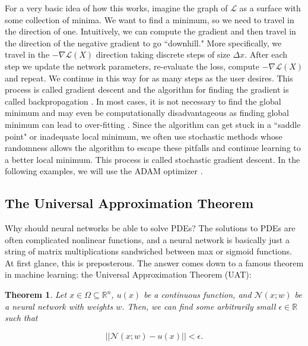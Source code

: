 \documentclass{CUP-JNL-DTM}%
\newtheorem{theorem}{Theorem}[section]
\theoremstyle{definition}
\numberwithin{equation}{section}
\newcommand{\loss}{\mathcal{L}}
\newcommand{\net}{\mathcal{N}}
\begin{document}
For a very basic idea of how this works, imagine the graph of $\loss$ as a surface with some collection of minima. We want to find a minimum, so we need to travel in the direction of one. Intuitively, we can compute the gradient and then travel in the direction of the negative gradient to go ``downhill." More specifically, we travel in the $-\nabla \loss(X)$ direction taking discrete steps of size $\Delta x$. After each step we update the network parameters, re-evaluate the loss, compute $-\nabla \loss(X)$ and repeat. We continue in this way for as many steps as the user desires. This process is called gradient descent and the algorithm for finding the gradient is called backpropagation \cite{chauvinBackpropagationTheoryArchitectures1995}. In most cases, it is not necessary to find the global minimum and may even be computationally disadvantageous as finding global minimum can lead to over-fitting \cite{choromanskaLossSurfacesMultilayer2015}. Since the algorithm can get stuck in a ``saddle point" or inadequate local minimum, we often use stochastic methods whose randomness allows the algorithm to escape these pitfalls and continue learning to a better local minimum. This process is called stochastic gradient descent. In the following examples, we will use the ADAM optimizer \cite{kingmaAdamMethodStochastic2017}. 


\subsection{The Universal Approximation Theorem}

Why should neural networks be able to solve PDEs? The solutions to PDEs are often complicated nonlinear functions, and a neural network is basically just a string of matrix multiplications sandwiched between max or sigmoid functions. At first glance, this is preposterous. The answer comes down to a famous theorem in machine learning: the Universal Approximation Theorem (UAT):

\begin{theorem}

Let $x \in \Omega \subseteq \mathbb{R}^n$, $u(x)$ be a continuous function, and $\net(x;w)$ be a neural network with weights $w$. Then, we can find some arbitrarily small $\epsilon \in \mathbb{R}$ such that 

\begin{equation}
	||\net(x;w) - u(x)|| < \epsilon. 
\end{equation}

\end{theorem}
\end{document}

